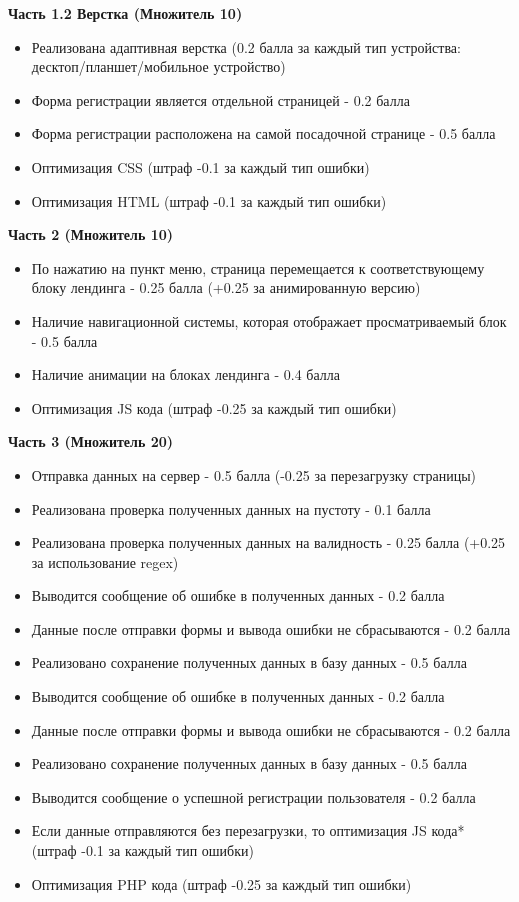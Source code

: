 \textbf{Часть 1.2 Верстка (Множитель 10)}
\begin{itemize}
    \item Реализована адаптивная верстка (0.2 балла за каждый тип устройства: десктоп/планшет/мобильное устройство)
    \item Форма регистрации является отдельной страницей - 0.2 балла
    \item Форма регистрации расположена на самой посадочной странице - 0.5 балла
    \item Оптимизация CSS (штраф -0.1 за каждый тип ошибки)
    \item Оптимизация HTML (штраф -0.1 за каждый тип ошибки)
\end{itemize}

\textbf{Часть 2 (Множитель 10)}
\begin{itemize}
    \item По нажатию на пункт меню, страница перемещается к соответствующему блоку лендинга  - 0.25 балла (+0.25 за анимированную версию)
    \item Наличие навигационной системы, которая отображает просматриваемый блок - 0.5 балла
    \item Наличие анимации на блоках лендинга - 0.4 балла
    \item Оптимизация JS кода (штраф -0.25 за каждый тип ошибки)
\end{itemize}

\textbf{Часть 3 (Множитель 20)}
\begin{itemize}
    \item Отправка данных на сервер - 0.5 балла (-0.25 за перезагрузку страницы)
    \item Реализована проверка полученных данных на пустоту - 0.1 балла
    \item Реализована проверка полученных данных на валидность - 0.25 балла (+0.25 за использование regex)
    \item Выводится сообщение об ошибке в полученных данных - 0.2 балла
    \item Данные после отправки формы и вывода ошибки не сбрасываются - 0.2 балла
    \item Реализовано сохранение полученных данных в базу данных - 0.5 балла
    \item Выводится сообщение об ошибке в полученных данных - 0.2 балла
    \item Данные после отправки формы и вывода ошибки не сбрасываются - 0.2 балла
    \item Реализовано сохранение полученных данных в базу данных - 0.5 балла
    \item Выводится сообщение о успешной регистрации пользователя - 0.2 балла
    \item Если данные отправляются без перезагрузки, то оптимизация JS кода* (штраф -0.1 за каждый тип ошибки)
    \item Оптимизация PHP кода  (штраф -0.25 за каждый тип ошибки)
\end{itemize}

